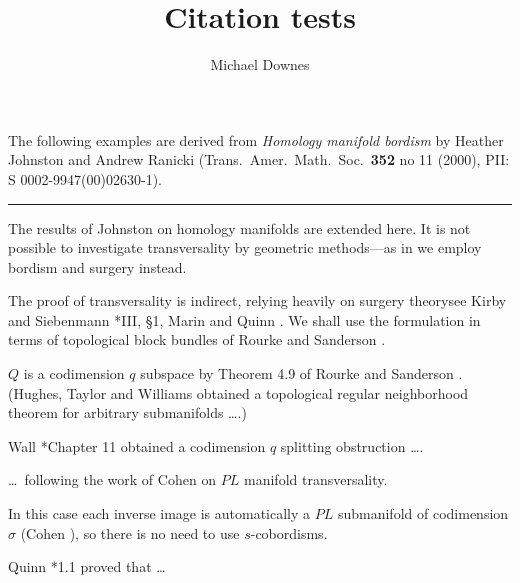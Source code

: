 \documentclass{amsart}
\newenvironment{dual}{%
  \par\medskip
  \trivlist\item[]%
}{%
  \endtrivlist
}
\begin{document}
\title{Citation tests}
\author{Michael Downes}

   The following examples are derived from
   \emph{Homology manifold bordism} by Heather Johnston and Andrew
   Ranicki (Trans.\ Amer.\ Math.\ Soc.\ \textbf{352} no 11 (2000), PII: S
   0002-9947(00)02630-1).

\bigskip \noindent \rule{\columnwidth}{0.5pt}\par

\setcounter{section}{3}
\begin{dual}
The results of Johnston \cite{Jo} on homology
manifolds are extended here. It is not
possible to investigate transversality by
geometric methods---as in \cite{Jo} we employ
bordism and surgery instead.
\end{dual}

\begin{dual}
The proof of transversality is indirect,
relying heavily on surgery theory\mdash see
Kirby and Siebenmann \cite{KS}*{III, \S 1},
Marin \cite{M} and Quinn \cite{Q3}. We shall
use the formulation in terms of topological
block bundles of Rourke and Sanderson
\cite{RS}.
\end{dual}

\begin{dual}
$Q$ is a codimension $q$ subspace by Theorem
4.9 of Rourke and Sanderson \cite{RS}.
(Hughes, Taylor and Williams \cite{HTW}
obtained a topological regular neighborhood
theorem for arbitrary submanifolds \dots.)
\end{dual}

\begin{dual}
Wall \cite{Wa}*{Chapter 11} obtained a
codimension $q$ splitting obstruction \dots.
\end{dual}

\begin{dual}
\dots\ following the work of Cohen \cite{Co}
on $PL$ manifold transversality.
\end{dual}

\begin{dual}
In this case each inverse image is
automatically a $PL$ submanifold of
codimension $\sigma$ (Cohen \cite{Co}), so
there is no need to use $s$-cobordisms.
\end{dual}

\begin{dual}
Quinn \cite{Q2}*{1.1} proved that \dots
\end{dual}
\end{document}
